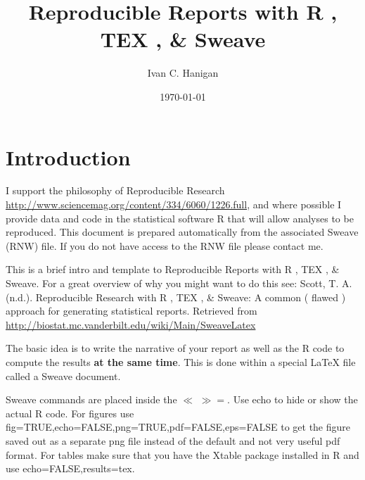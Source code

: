 \documentclass[a4paper]{report}
\begin{document}





\title{Reproducible Reports with R , TEX , \& Sweave}
\author{Ivan C. Hanigan}
\date{\today}
\maketitle
\tableofcontents

\section{Introduction}
I support the philosophy of Reproducible Research \url{http://www.sciencemag.org/content/334/6060/1226.full}, and where possible I provide data and code in the statistical software R that will allow analyses to be reproduced.  This document is prepared automatically from the associated Sweave (RNW) file.  If you do not have access to the RNW file please contact me.

This is a brief intro and template to Reproducible Reports with R , TEX , \& Sweave. For a great overview of why you might want to do this see: 
Scott, T. A. (n.d.). Reproducible Research with R , TEX , \& Sweave: A common ( flawed ) approach for generating statistical reports. Retrieved from \url{http://biostat.mc.vanderbilt.edu/wiki/Main/SweaveLatex}

The basic idea is to write the narrative of your report as well as the R code to compute the results \textbf{at the same time}.  This is done within a special LaTeX file called a Sweave document.  


Sweave commands are placed inside the $\ll$ $\gg=$. Use echo to hide or show the actual R code. For figures use fig=TRUE,echo=FALSE,png=TRUE,pdf=FALSE,eps=FALSE to get the figure saved out as a separate png file instead of the default and not very useful pdf format. For tables make sure that you have the Xtable package installed in R and use echo=FALSE,results=tex.
\end{document}
